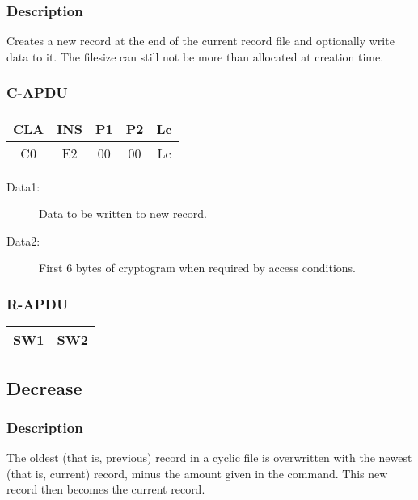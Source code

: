 \documentclass[a4paper,oneside]{article}
\begin{document}
\subsubsection*{Description}

Creates a new record at the end of the current record file and
optionally write data to it. The filesize can still not be more
than allocated at creation time.

\subsubsection*{C-APDU}

\begin{tabular}{|c|c|c|c|c|} \hline
CLA & INS & P1 & P2 & Lc \\ \hline \hline
C0 & E2 & 00 & 00 & Lc \\ \hline
\end{tabular}

\begin{description}
\item[Data1:] Data to be written to new record.
\item[Data2:] First 6 bytes of cryptogram when required by access conditions.
\end{description}

\subsubsection*{R-APDU}

\begin{tabular}{|c|c|} \hline
SW1 & SW2 \\ \hline
\end{tabular}


\subsection{Decrease}

\subsubsection*{Description}

The oldest (that is, previous) record in a cyclic file is overwritten
with the newest (that is, current) record, minus the amount given
in the command. This new record then becomes the current record.
\end{document}
